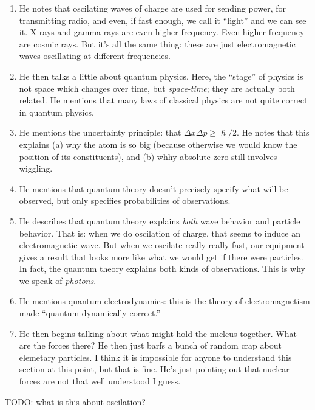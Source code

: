 \begin{enumerate}
  \item He notes that oscilating waves of charge are used for sending
  power, for transmitting radio, and even, if fast enough, we call it
  ``light'' and we can see it. X-rays and gamma rays are even higher
  frequency. Even higher frequency are cosmic rays. But it's all the
  same thing: these are just electromagnetic waves oscillating at
  different frequencies.

  \item He then talks a little about quantum physics. Here, the
  ``stage'' of physics is not space which changes over time, but
  \emph{space-time}; they are actually both related. He mentions that
  many laws of classical physics are not quite correct in quantum
  physics.

  \item He mentions the uncertainty principle: that $\Delta x \Delta p
  \geq \hslash/2$. He notes that this explains (a) why the atom is so
  big (because otherwise we would know the position of its
  constituents), and (b) whhy absolute zero still involves wiggling.

  \item He mentions that quantum theory doesn't precisely specify what
  will be observed, but only specifies probabilities of observations.

  \item He describes that quantum theory explains \emph{both} wave
  behavior and particle behavior. That is: when we do oscilation of
  charge, that seems to induce an electromagnetic wave. But when we
  oscilate really really fast, our equipment gives a result that looks
  more like what we would get if there were particles. In fact, the
  quantum theory explains both kinds of observations. This is why we
  speak of \emph{photons}.

  \item He mentions quantum electrodynamics: this is the theory of
  electromagnetism made ``quantum dynamically correct.''

  \item He then begins talking about what might hold the nucleus
  together. What are the forces there? He then just barfs a bunch of
  random crap about elemetary particles. I think it is impossible for
  anyone to understand this section at this point, but that is fine.
  He's just pointing out that nuclear forces are not that well
  understood I guess.
\end{enumerate}

TODO: what is this about oscilation?
